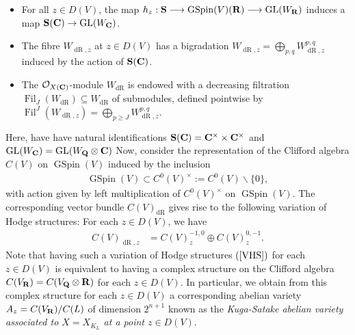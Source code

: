 \documentclass{amsart}
\theoremstyle{definition}
\theoremstyle{definition}
\theoremstyle{definition}
\begin{document}
\begin{itemize}

\item[(i)] For all $z \in D(V)$, the map $h_z: {\bf{S}} \longrightarrow \operatorname{GSpin}(V) ({\bf{R}}) \longrightarrow \operatorname{GL}(W_{\bf{R}})$ 
induces a map ${\bf{S}}({\bf{C}}) \rightarrow \operatorname{GL}(W_{\bf{C}})$. \\

\item[(ii)]The fibre $W_{\operatorname{dR}, z}$ at $z \in D(V)$ has a bigradation $W_{\operatorname{dR}, z} = \bigoplus_{p, q} W_{\operatorname{dR}, z}^{p,q}$ 
induced by the action of ${\bf{S}}({\bf{C}})$. \\

\item[(iii)] The $\mathcal{O}_{X({\bf{C}})}$-module $W_{\operatorname{dR}}$ is endowed with a 
decreasing filtration $\operatorname{Fil}_J(W_{\operatorname{dR}}) \subseteq W_{\operatorname{dR}}$
of submodules, defined pointwise by 
$\operatorname{Fil}^J(W_{\operatorname{dR}, z}) = \bigoplus_{p \geq J} W_{\operatorname{dR}, z}^{p, q}$. \\ \end{itemize}
Here, have have natural identifications ${\bf{S}}({\bf{C}}) = {\bf{C}}^{\times} \times {\bf{C}}^{\times}$ 
and $\operatorname{GL}(W_{\bf{C}}) = \operatorname{GL}(W_{\bf{Q}} \otimes {\bf{C}})$
Now, consider the representation of the Clifford algebra $C(V)$ on $\operatorname{GSpin}(V)$ induced by the inclusion 
\begin{align*} \operatorname{GSpin}(V) \subset C^0(V)^{\times} := C^0(V) \backslash \lbrace 0 \rbrace, \end{align*} 
with action given by left multiplication of $C^0(V)^{\times}$ on $\operatorname{GSpin}(V)$. The corresponding vector bundle
$C(V)_{\operatorname{dR}}$ gives rise to the following variation of Hodge structures: For each $z \in D(V)$, we have 
\begin{align}\label{VHS} C(V)_{\operatorname{dR}, z} &= C(V)_z^{-1, 0} \oplus C(V)_{z}^{0, -1}. \end{align}
Note that having such a variation of Hodge structures $(\ref{VHS})$ for each $z \in D(V)$ is equivalent to 
having a complex structure on the Clifford algebra $C(V_{\bf{R}}) = C(V_{\bf{Q}} \otimes {\bf{R}})$ for each $z \in D(V)$. 
In particular, we obtain from this complex structure for each $z \in D(V)$ a corresponding abelian variety $A_z = C(V_{\bf{R}})/C(L)$
of dimension $2^{n+1}$ known as the {\it{Kuga-Satake abelian variety associated to $X = X_{K_L}$ at a point $z \in D(V)$}}.
\end{document}
